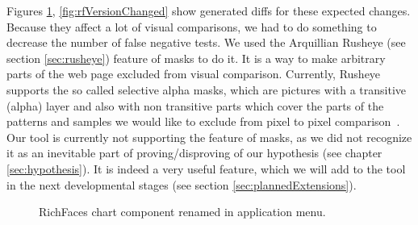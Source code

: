 \documentclass[11pt,oneside,final]{fithesis2}
\begin{document}
  Figures \ref{fig:chartComponentRenamed}, \ref{fig:rfVersionChanged} show generated diffs for these expected changes. Because they
  affect a lot of visual comparisons, we had to do something to decrease the number of false negative tests. We used the Arquillian Rusheye 
  (see section \ref{sec:rusheye}) feature of masks to do it. It is a way to make arbitrary parts of the web page excluded from
  visual comparison. Currently, Rusheye supports the so called selective alpha masks, which are pictures with a transitive (alpha) layer
  and also with non transitive parts which cover the parts of the patterns and samples we would like to exclude from pixel to
  pixel comparison~\citep{lukas_bc_thesis}. Our tool is currently not supporting the feature of masks, as we did not recognize it as an inevitable part of
  proving/disproving of our hypothesis (see chapter \ref{sec:hypothesis}). It is indeed a very useful feature, which we will
  add to the tool in the next developmental stages (see section \ref{sec:plannedExtensions}).
  
  \begin{figure}[h!]
      \begin{center}
      \leavevmode
      \centerline{}
      \end{center}
      \caption{RichFaces chart component renamed in application menu.}
      \label{fig:chartComponentRenamed}
  \end{figure}
  
\end{document}
